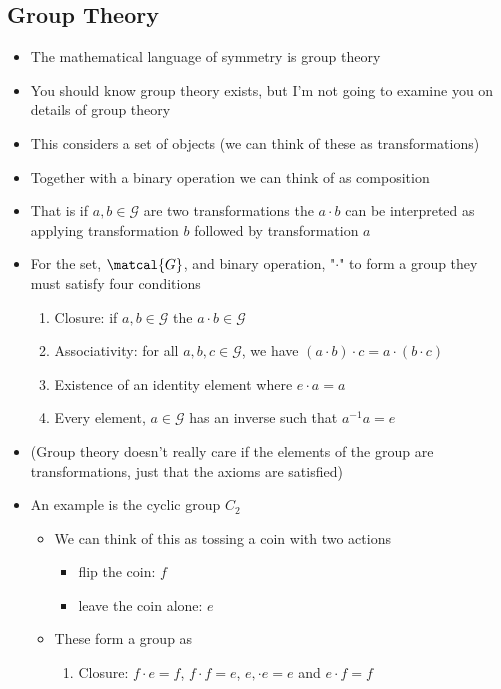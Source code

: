 \documentclass[11pt]{article}
\begin{document}
\subsection{Group Theory}
\label{sec:org8927e29}
\begin{itemize}
\item The mathematical language of symmetry is group theory
\item You should know group theory exists, but I'm not going to examine you on details
of group theory
\item This considers a set of objects (we can think of these as transformations)
\item Together with a binary operation we can think of as composition
\item That is if \(a,b\in\mathcal{G}\) are two transformations the \(a\cdot b\) can be 
interpreted as applying transformation \(b\) followed by transformation \(a\)
\item For the set, \(\matcal{G}\), and binary operation, "\(\cdot\)" to form a group they must satisfy four conditions
\begin{enumerate}
\item Closure: if \(a,b\in\mathcal{G}\) the \(a\cdot b \in \mathcal{G}\)
\item Associativity: for all \(a,b,c\in\mathcal{G}\), we have \((a\cdot b)\cdot c = a \cdot (b\cdot c)\)
\item Existence of an identity element where \(e\cdot a =a\)
\item Every element, \(a\in\mathcal{G}\) has an inverse such that \(a^{-1} a = e\)
\end{enumerate}
\item (Group theory doesn't really care if the elements of the group are transformations,
just that the axioms are satisfied)
\item An example is the cyclic group \(C_{2}\)
\begin{itemize}
\item We can think of this as tossing a coin with two actions
\begin{itemize}
\item flip the coin: \(f\)
\item leave the coin alone: \(e\)
\end{itemize}
\item These form a group as
\begin{enumerate}
\item Closure: \(f\cdot e=f\), \(f\cdot f = e\), \(e,\cdot e=e\) and \(e \cdot f =f\)

\end{enumerate}
\end{itemize}
\end{itemize}
\end{document}
